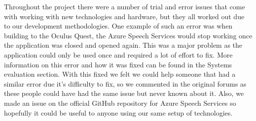 Throughout the project there were a number of trial and error issues that come with working with new technologies and hardware, but they all worked out due to our development methodologies. One example of such an error was when building to the Oculus Quest, the Azure Speech Services would stop working once the application was closed and opened again. This was a major problem as the application could only be used once and required a lot of effort to fix. More information on this error and how it was fixed can be found in the Systems evaluation section. With this fixed we felt we could help someone that had a similar error due it's difficulty to fix, so we commented in the original forums as these people could have had the same issue but never known about it. Also, we made an issue on the official GitHub repository for Azure Speech Services so hopefully it could be useful to anyone using our same setup of technologies.


